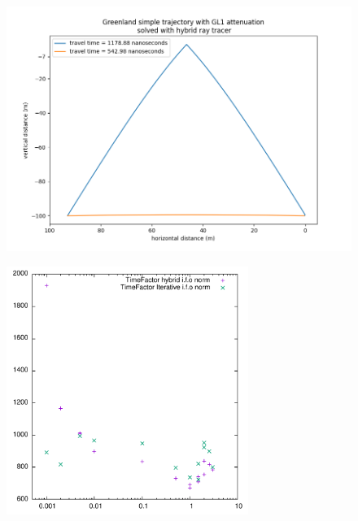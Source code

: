 \documentclass{beamer}
\begin{document}
\begin{frame}
	\begin{figure}
		\includegraphics[width=\textwidth]{figures/hybrid.png}
	\end{figure}
\end{frame}
\begin{frame}
	\begin{figure}
		\includegraphics[width=0.7\textwidth]{figures/NormVsTime.pdf}
	\end{figure}
\end{frame}
\end{document}
